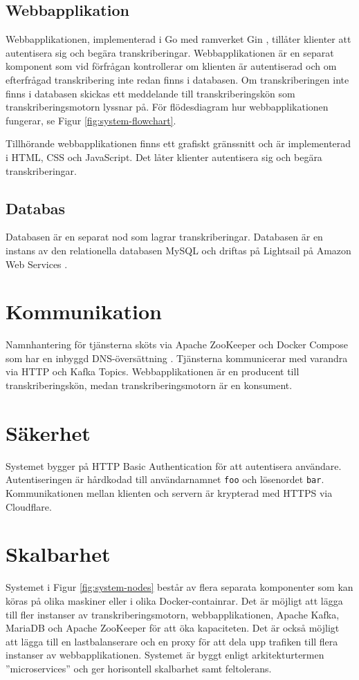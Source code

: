 \subsection{Webbapplikation}
\label{sec:web-application}
Webbapplikationen, implementerad i Go med ramverket Gin \cite{GinGonic},
tillåter klienter att autentisera sig och begära transkriberingar.
Webbapplikationen är en separat komponent som vid förfrågan kontrollerar om
klienten är autentiserad och om efterfrågad transkribering inte redan finns i
databasen. Om transkriberingen inte finns i databasen skickas ett meddelande
till transkriberingskön som transkriberingsmotorn lyssnar på. För
flödesdiagram hur webbapplikationen fungerar, se Figur
\ref{fig:system-flowchart}.

Tillhörande webbapplikationen finns ett grafiskt gränssnitt och är
implementerad i HTML, CSS och JavaScript. Det låter klienter autentisera sig
och begära transkriberingar. 

\subsection{Databas}
\label{sec:database}
Databasen är en separat nod som lagrar transkriberingar. Databasen är en
instans av den relationella databasen MySQL och driftas på Lightsail på Amazon
Web Services \cite{AmazonWebServices2024Lightsail}.

\section{Kommunikation}
\label{sec:communication}
Namnhantering för tjänsterna sköts via Apache ZooKeeper och
Docker Compose som har en inbyggd DNS-översättning \cite{ApacheZooKeeper,
DockerNetworkingDocumentation2024}. Tjänsterna kommunicerar med varandra via
HTTP och Kafka Topics. Webbapplikationen är en producent till
transkriberingskön, medan transkriberingsmotorn är en konsument. 

\section{Säkerhet}
\label{sec:security}
Systemet bygger på HTTP Basic Authentication \cite{RFC7617} för att autentisera
användare. Autentiseringen är hårdkodad till användarnamnet \verb|foo| och
lösenordet \verb|bar|. Kommunikationen mellan klienten och servern är
krypterad med HTTPS via Cloudflare.

\section{Skalbarhet}
\label{sec:scalability}
Systemet i Figur \ref{fig:system-nodes} består av flera separata komponenter
som kan köras på olika maskiner eller i olika Docker-containrar. Det är möjligt
att lägga till fler instanser av transkriberingsmotorn, webbapplikationen,
Apache Kafka, MariaDB och Apache ZooKeeper för att öka kapaciteten. Det är
också möjligt att lägga till en lastbalanserare och en proxy för att dela upp
trafiken till flera instanser av webbapplikationen. Systemet är byggt enligt
arkitekturtermen ''microservices'' \cite{MicroservicesIO2024} och ger
horisontell skalbarhet samt feltolerans.
